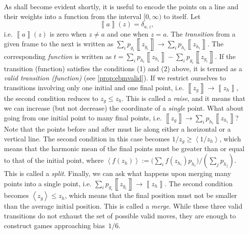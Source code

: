 \documentclass{article}
\begin{document}
%

%
As shall become evident shortly, it is useful to
encode the points on a line and their weights into a function from the
interval $[0,\infty)$ to itself. Let
\begin{equation}
  \left\llbracket a\right\rrbracket (z)=\delta_{a,z},\label{eq:MochonBracketPointGame}
\end{equation}
i.e. $\left\llbracket a\right\rrbracket (z)$
is zero when $z\neq a$ and one when $z=a$.
The \emph{transition} from a given frame to the next is written
as $\sum_{i}p_{g_{i}}\left\llbracket z_{g_{i}}\right\rrbracket \to\sum_{i}p_{h_{i}}\left\llbracket z_{h_{i}}\right\rrbracket $.
The corresponding
\emph{function} is written as $t=\sum_{i}p_{h_{i}}\left\llbracket z_{h_{i}}\right\rrbracket -\sum_{i}p_{g_{i}}\left\llbracket z_{g_{i}}\right\rrbracket $.
If the transition (function) satisfies the conditions (1) and (2)
above, it
is termed as a \emph{valid transition (function)} (see \cref{prop:ebmvalid}). %
If we restrict ourselves to transitions involving only one initial
and one final point, i.e. $\left\llbracket z_{g}\right\rrbracket \to\left\llbracket z_{h}\right\rrbracket $,
the second condition reduces to $z_{g}\le z_{h}$. This is called a \emph{raise}, and it means that we can
increase (but not decrease) the coordinate of a \emph{single} point. %
What about going from one
initial point to many final points, i.e. $\left\llbracket z_{g}\right\rrbracket \to\sum_{i}p_{h_{i}}\left\llbracket z_{h_{i}}\right\rrbracket $?
Note that the points before and after must lie along either a horizontal
or a vertical line. The second condition in this case becomes $1/z_{g}\ge\left\langle 1/z_{h}\right\rangle $,
which means that the harmonic mean
of the final points must be greater than or equal to that of the initial
point, where $\left\langle f(z_{h})\right\rangle:=\Big(\sum_{i}f(z_{h_{i}})p_{h_{i}}\Big)/ \left(\sum_{j}p_{h_j}\right)$.
This is called a \emph{split}. Finally, we can ask what happens upon
merging many points into a single point, i.e. $\sum_{i}p_{g_{i}}\left\llbracket z_{g_{i}}\right\rrbracket \to\left\llbracket z_{h}\right\rrbracket $.
The second condition becomes $\left\langle z_{g}\right\rangle \le z_{h}$,
which means that the final position must not be smaller than the average initial
position. This is called a \emph{merge}. While these three valid transitions
do not exhaust the set of possible valid moves, they are enough to construct games
approaching bias~$1/6$.
\end{document}
